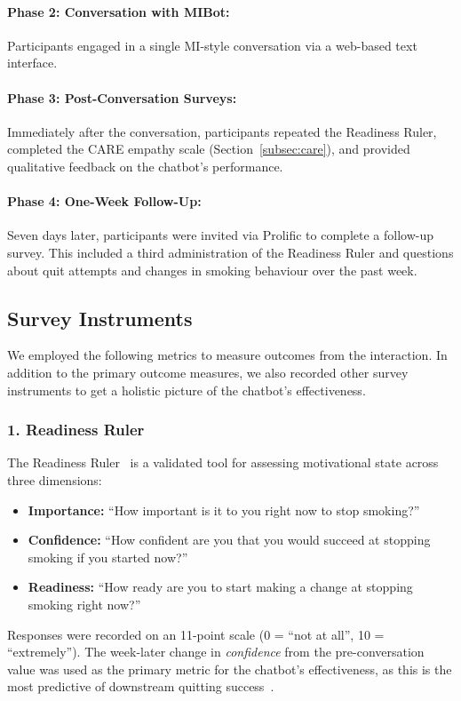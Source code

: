\paragraph{Phase 2: Conversation with MIBot:}
Participants engaged in a single MI-style conversation via a web-based text interface.

\paragraph{Phase 3: Post-Conversation Surveys:}
Immediately after the conversation, participants repeated the Readiness Ruler, completed the CARE empathy scale (Section~\ref{subsec:care}), and provided qualitative feedback on the chatbot's performance.

\paragraph{Phase 4: One-Week Follow-Up:}
Seven days later, participants were invited via Prolific to complete a follow-up survey. This included a third administration of the Readiness Ruler and questions about quit attempts and changes in smoking behaviour over the past week.

\subsection{Survey Instruments}
\label{subsec:survey-instruments}

We employed the following metrics to measure outcomes from the interaction. In addition to the primary outcome measures, we also recorded other survey instruments to get a holistic picture of the chatbot's effectiveness.

\subsubsection{1. Readiness Ruler}
\label{subsec:readiness-ruler}
The Readiness Ruler~\citep{rollnick1992development} is a validated tool for assessing motivational state across three dimensions:
\begin{itemize}
    \item \textbf{Importance:} ``How important is it to you right now to stop smoking?''
    \item \textbf{Confidence:} ``How confident are you that you would succeed at stopping smoking if you started now?''
    \item \textbf{Readiness:} ``How ready are you to start making a change at stopping smoking right now?''
\end{itemize}
Responses were recorded on an 11-point scale (0 = ``not at all'', 10 = ``extremely''). The week-later change in \emph{confidence} from the pre-conversation value was used as the primary metric for the chatbot's effectiveness, as this is the most predictive
of downstream quitting success~\cite{Gwaltney2009-wj,Abar2013}.

